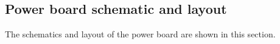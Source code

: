 \newpage
\begin{hugepage}
\subsection{Power board schematic and layout}
The schematics and layout of the power board are shown in this section.\\

\pdfpagewidth
\begin{figure}
\centering


\end{figure}
\end{hugepage}
\newpage
